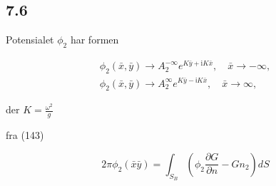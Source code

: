 \subsection{7.6}

Potensialet $\phi_2$ har formen 

\begin{align}
	\phi_2(\bar{x},\bar{y}) \rightarrow A_2^{-\infty} e^{K\bar{y} + \mathrm{i}  K\bar{x}}, \quad \bar{x} \rightarrow -\infty, \\
	\phi_2(\bar{x},\bar{y}) \rightarrow A_2^{\infty} e^{K\bar{y} - \textsf{i}  K \bar{x}}, \quad \bar{x} \rightarrow \infty,
\end{align}

der $K = \frac{\omega^2}{g}$

fra (143)

\begin{equation}
    2\pi \phi_2(\bar{x}\bar{y})  = \int_{S_B}  ( \phi_2  \frac{\partial G }{\partial n}-G n_2 )dS \tag{143}
\end{equation}






